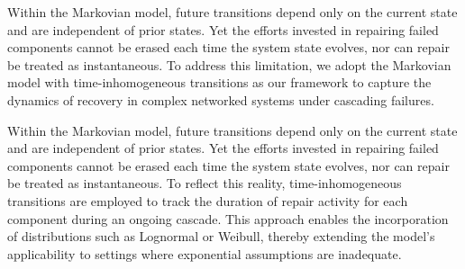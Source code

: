 Within the Markovian model, future transitions depend only on the current state and are independent of prior states. Yet the efforts invested in repairing failed components cannot be erased each time the system state evolves, nor can repair be treated as instantaneous. To address this limitation, we adopt the Markovian model with time-inhomogeneous transitions as our framework to capture the dynamics of recovery in complex networked systems under cascading failures.

Within the Markovian model, future transitions depend only on the current state and are independent of prior states. Yet the efforts invested in repairing failed components cannot be erased each time the system state evolves, nor can repair be treated as instantaneous. To reflect this reality, time-inhomogeneous transitions are employed to track the duration of repair activity for each component during an ongoing cascade. This approach enables the incorporation of distributions such as Lognormal or Weibull, thereby extending the model’s applicability to settings where exponential assumptions are inadequate.